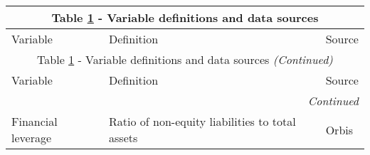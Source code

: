 	\centering
		\begin{longtable}{p{1.7in}p{2.6in}p{1.7in}}
				\label{tab:definition}\\
			\multicolumn{3}{c}{Table \ref{tab:definition} - Variable definitions and data sources}\\
			\hline 
			Variable      & Definition & Source \\
			\hline \endfirsthead
			
				\multicolumn{3}{c}{Table \ref{tab:definition} - Variable definitions and data sources \textit{(Continued)}}\\
			\hline 
			Variable      & Definition & Source \\
			\hline \endhead
			
			\hline
			\multicolumn{3}{r}{{\textit{Continued}}}\\ 
			\endfoot
			\hline
			\endlastfoot
			Financial leverage      & Ratio of non-equity liabilities to total assets & Orbis \\
		

\end{longtable}
